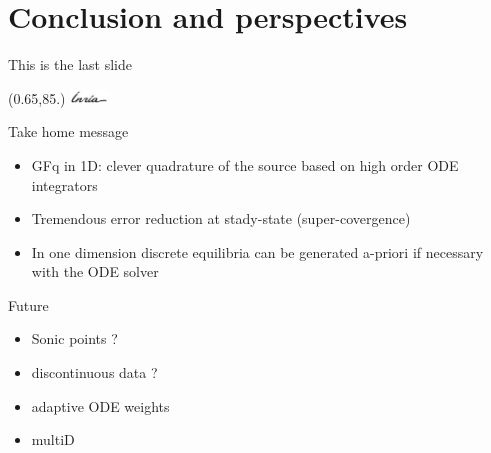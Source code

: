 \documentclass[aspectratio=169,9pt,mathserif]{beamer}
\newcommand{\MyLogoa}{%
 \begin{textblock}{14}(0.65,85.)%
  \includegraphics[width=1cm,angle=00]{inr_logo_noir}
 \end{textblock}

}
\begin{document}

 
      


\section[End]{Conclusion and perspectives}

  

 \begin{frame}{This is the last slide} 
\MyLogoa


\begin{block}{Take home message}
\begin{itemize}
\item GFq in 1D:  clever   quadrature of
the source based on high order ODE integrators

\vspace{0.1cm}

\item Tremendous error reduction  at stady-state (super-covergence)

\vspace{0.1cm}


\item  In one dimension  discrete equilibria can be generated a-priori if necessary   with the ODE solver

 
 \end{itemize}
 \end{block} 

\begin{alertblock}{Future}
\begin{itemize}
\item   Sonic points ? 

\vspace{0.1cm}

\item discontinuous  data ?

\vspace{0.1cm}

\item adaptive ODE weights

\vspace{0.1cm}

\item multiD 
 \end{itemize}
 \end{alertblock} 
 \end{frame}



 

%
%
% 
% 
  

  
 
\end{document}
